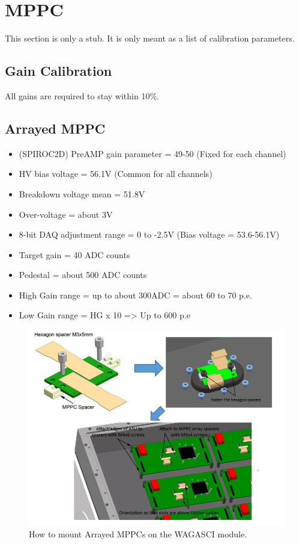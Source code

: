 \section{MPPC}
This section is only a stub. It is only meant as a list of calibration
parameters.

\subsection{Gain Calibration}
All gains are required to stay within 10\%.

\subsection{Arrayed MPPC}
\begin{itemize}
\item (SPIROC2D) PreAMP gain parameter = 49-50 (Fixed for each channel)
\item HV bias voltage = 56.1V (Common for all channels)
\item Breakdown voltage mean = 51.8V
\item Over-voltage = about 3V
\item 8-bit DAQ adjustment range = 0 to -2.5V (Bias voltage = 53.6-56.1V)
\item Target gain = 40 ADC counts
\item Pedestal = about 500 ADC counts
\item High Gain range = up to about 300ADC = about 60 to 70 p.e.
\item Low Gain range = HG x 10 => Up to 600 p.e
\end{itemize}
\begin{figure}[H]
    \includegraphics[width=\linewidth]{MPPC-WAGASCI-mounting}
    \caption{How to mount Arrayed MPPCs on the WAGASCI
      module.}\label{fig:MPPC-WAGASCI-mounting}
  \end{figure}


